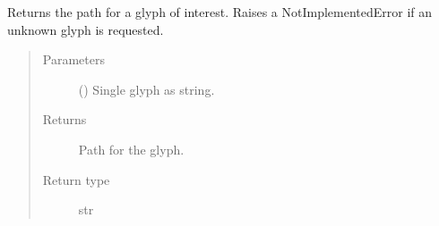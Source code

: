 \documentclass[letterpaper,10pt,english,openany,oneside]{sphinxmanual}
\begin{document}

\begin{fulllineitems}
\label{\detokenize{pages/modules:lmd.tools.glyph_path}}
\sphinxAtStartPar
Returns the path for a glyph of interest. Raises a NotImplementedError if an unknown glyph is requested.
\begin{quote}\begin{description}
\item[{Parameters}] \leavevmode
\sphinxAtStartPar
{} () \textendash{} Single glyph as string.

\item[{Returns}] \leavevmode
\sphinxAtStartPar
Path for the glyph.

\item[{Return type}] \leavevmode
\sphinxAtStartPar
str

\end{description}\end{quote}

\end{fulllineitems}

\end{document}
